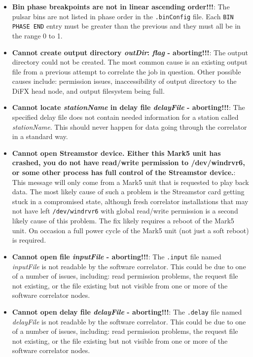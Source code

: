 \begin{itemize}

\item {\bf Bin phase breakpoints are not in linear ascending order!!!}:
The pulsar bins are not listed in phase order in the {\tt .binConfig} file.
Each {\tt BIN PHASE END} entry must be greater than the previous and they must all be in the range 0 to 1.

\item {\bf Cannot create output directory {\it outDir}: {\it flag} - aborting!!!}:
The output directory could not be created.
The most common cause is an existing output file from a previous attempt to correlate the job in question.
Other possible causes include: permission issues, inaccessibility of output directory to the DiFX head node, and output filesystem being full.

\item {\bf Cannot locate {\it stationName} in delay file {\it delayFile} - aborting!!!}:
The specified delay file does not contain needed information for a station called {\it stationName}.
This should never happen for data going through the correlator in a standard way.

\item {\bf Cannot open Streamstor device.  Either this Mark5 unit has crashed, you do not have read/write permission to /dev/windrvr6, or some other process has full control of the Streamstor device.}:
This message will only come from a Mark5 unit that is requested to play back data.
The most likely cause of such a problem is the Streamstor card getting stuck in a compromised state, although fresh correlator installations that may not have left {\tt /dev/windrvr6} with global read/write permission is a second likely cause of this problem.
The fix likely requires a reboot of the Mark5 unit.
On occasion a full power cycle of the Mark5 unit (not just a soft reboot) is required.

\item {\bf Cannot open file {\it inputFile} - aborting!!!}:
The {\tt .input} file named {\it inputFile} is not readable by the software correlator.
This could be due to one of a number of issues, including: read permission problems, the request file not existing, or the file existing but not visible from one or more of the software correlator nodes.

\item {\bf Cannot open delay file {\it delayFile} - aborting!!!}:
The {\tt .delay} file named {\it delayFile} is not readable by the software correlator.
This could be due to one of a number of issues, including: read permission problems, the request file not existing, or the file existing but not visible from one or more of the software correlator nodes.


\end{itemize}
